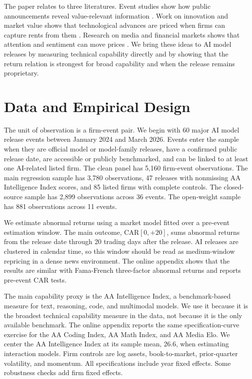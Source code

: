 \documentclass[12pt]{article}
\begin{document}
The paper relates to three literatures. Event studies show how public
announcements reveal value-relevant information \citep{MacKinlay1997}. Work on
innovation and market value shows that technological advances are priced when
firms can capture rents from them \citep{Teece1986,HallJaffeTrajtenberg2005}.
Research on media and financial markets shows that attention and sentiment can
move prices \citep{Tetlock2007,EngelbergParsons2011}. We bring these ideas to AI
model releases by measuring technical capability directly and by showing that the
return relation is strongest for broad capability and when the release remains
proprietary.

\section{Data and Empirical Design}
\label{sec:data}

The unit of observation is a firm-event pair. We begin with 60 major AI model
release events between January 2024 and March 2026. Events enter the sample when
they are official model or model-family releases, have a confirmed public release
date, are accessible or publicly benchmarked, and can be linked to at least one
AI-related listed firm. The clean panel has 5,160 firm-event observations. The
main regression sample has 3,780 observations, 47 releases with nonmissing AA
Intelligence Index scores, and 85 listed firms with complete controls. The
closed-source sample has 2,899 observations across 36 events. The open-weight
sample has 881 observations across 11 events.

We estimate abnormal returns using a market model fitted over a pre-event
estimation window. The main outcome, CAR$[0,{+}20]$, sums abnormal returns from
the release date through 20 trading days after the release. AI releases are
clustered in calendar time, so this window should be read as medium-window
repricing in a dense news environment. The online appendix shows that the
results are similar with Fama-French three-factor abnormal returns and reports
pre-event CAR tests.

The main capability proxy is the AA Intelligence Index, a benchmark-based
measure for text, reasoning, code, and multimodal models. We use it because it is
the broadest technical capability measure in the data, not because it is the only
available benchmark. The online appendix reports the same specification-curve
exercise for the AA Coding Index, AA Math Index, and AA Media Elo. We center the
AA Intelligence Index at its sample mean, 26.6, when estimating interaction
models. Firm controls are log assets, book-to-market, prior-quarter volatility,
and momentum. All specifications include year fixed effects. Some robustness
checks add firm fixed effects.
\end{document}

